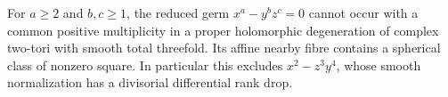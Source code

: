 \begin{proposition}\hypertarget{tag-02WP}{}\label{night:P4.18}\label{stmt:P4.18}


For $a\geq2$ and $b,c\geq1$, the reduced germ
$x^a-y^bz^c=0$ cannot occur with a common positive multiplicity
in a proper holomorphic degeneration of complex two-tori with
smooth total threefold. Its affine
nearby fibre contains a spherical class of nonzero square.
In particular this excludes $x^2-z^3y^4$, whose smooth
normalization has a divisorial differential rank drop.
\end{proposition}
